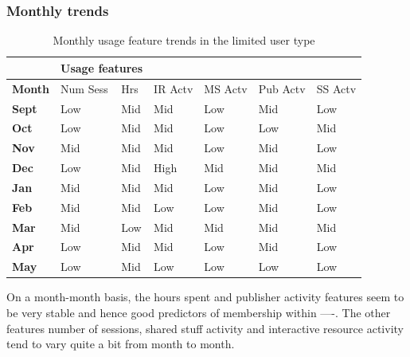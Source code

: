 \documentclass{acm_proc_article-sp}
\begin{document}
\subsubsection{Monthly trends}
\begin{table}
\caption{Monthly usage feature trends in the limited user type}
\begin{tabular}{|p{1.5cm}|p{0.6cm}|p{0.6cm}|p{0.6cm}|p{0.6cm}|p{0.8cm}|p{0.8cm}|}
& \multicolumn{2}{r}{\textbf{Usage features}}  \\ \hline
 \textbf{Month} 
 & Num Sess & Hrs & IR Actv & MS Actv & Pub Actv & SS Actv \\ \hline
\textbf{Sept} & Low                                    & Mid   & Mid         & Low             & Mid            & Low                 \\  \hline
\textbf{Oct}   & Low                                    & Mid   & Mid         & Low             & Low            & Mid                 \\  \hline
\textbf{Nov}  & Mid                                    & Mid   & Mid         & Low             & Mid            & Low                 \\  \hline
\textbf{Dec}  & Low                                    & Mid   & High        & Mid             & Mid            & Mid                 \\  \hline
\textbf{Jan}   & Mid                                    & Mid   & Mid         & Low             & Mid            & Low                 \\ \hline
\textbf{Feb}  & Mid                                    & Mid   & Low         & Low             & Mid            & Low                 \\  \hline
\textbf{Mar}     & Mid                                    & Low   & Mid         & Mid             & Mid            & Mid                 \\ \hline
\textbf{Apr}     & Low                                    & Mid   & Mid         & Low             & Mid            & Low                 \\ \hline
\textbf{May}       & Low                                    & Mid   & Low         & Low             & Low            &   Low              \\ \hline   
\end{tabular}
\end{table}
On a month-month basis, the hours spent and publisher activity features seem to be very stable and hence good predictors of membership within ----. The other features number of sessions, shared stuff activity and  interactive resource activity tend to vary quite a bit from month to month.
\end{document}
